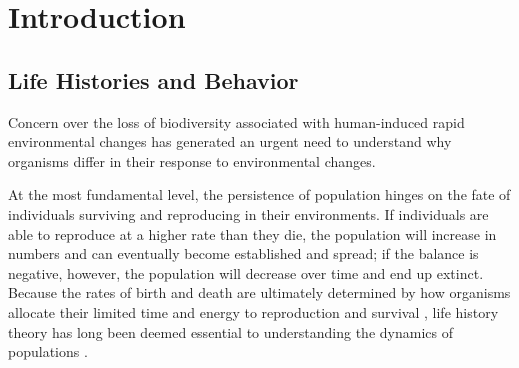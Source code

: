 \chapter{Introduction}\label{ch:intro}
\clearpage

\section{Life Histories and Behavior}

Concern over the loss of biodiversity associated with human-induced rapid 
environmental changes has generated an urgent need to understand why organisms 
differ in their response to environmental changes. 

At the most fundamental level, the persistence of population hinges on the fate 
of individuals surviving and reproducing in their environments. If individuals 
are able to reproduce at a higher rate than they die, the population will 
increase in numbers and can eventually become established and spread; if the 
balance is negative, however, the population will decrease over time and end up 
extinct. Because the rates of birth and death are ultimately determined by how 
organisms allocate their limited time and energy to reproduction and survival 
\citep{stearns1992evolution}, life history theory has long been 
deemed essential to understanding the dynamics of populations 
\citep{Saether2004, Sol2012a}.

